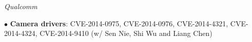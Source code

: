 \begin{description}
\item {\emph{Qualcomm}}
	\item $\bullet$ \textbf{Camera drivers}: 
		CVE-2014-0975, 
		CVE-2014-0976, 
		CVE-2014-4321, 
		CVE-2014-4324, 
		CVE-2014-9410 (w/ Sen Nie, Shi Wu and Liang Chen)
\end{description}

